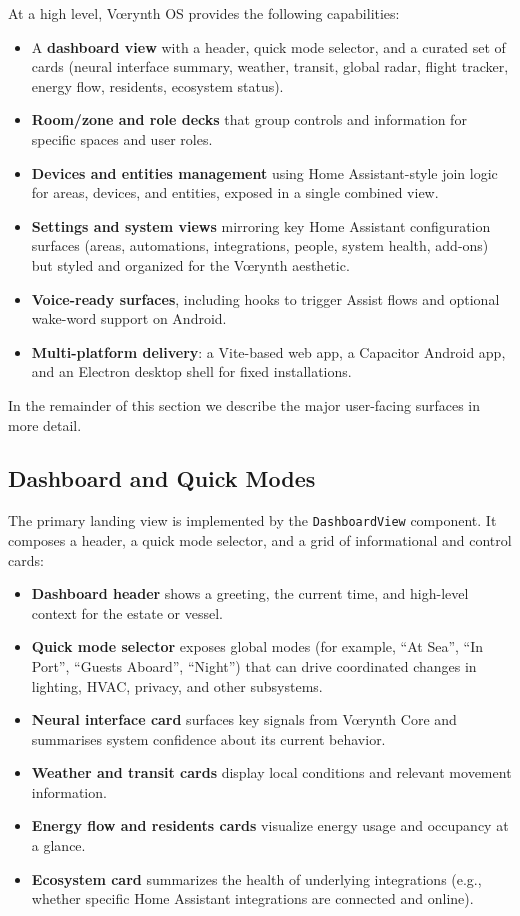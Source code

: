 \documentclass[11pt,a4paper]{article}
\begin{document}
At a high level, Vœrynth OS provides the following capabilities:
\begin{itemize}[leftmargin=*]
  \item A \textbf{dashboard view} with a header, quick mode selector, and a curated set of cards (neural interface summary, weather, transit, global radar, flight tracker, energy flow, residents, ecosystem status).
  \item \textbf{Room/zone and role decks} that group controls and information for specific spaces and user roles.
  \item \textbf{Devices and entities management} using Home Assistant-style join logic for areas, devices, and entities, exposed in a single combined view.
  \item \textbf{Settings and system views} mirroring key Home Assistant configuration surfaces (areas, automations, integrations, people, system health, add-ons) but styled and organized for the Vœrynth aesthetic.
  \item \textbf{Voice-ready surfaces}, including hooks to trigger Assist flows and optional wake-word support on Android.
  \item \textbf{Multi-platform delivery}: a Vite-based web app, a Capacitor Android app, and an Electron desktop shell for fixed installations.
\end{itemize}

In the remainder of this section we describe the major user-facing surfaces in more detail.

\subsection{Dashboard and Quick Modes}

The primary landing view is implemented by the \texttt{DashboardView} component. It composes a header, a quick mode selector, and a grid of informational and control cards:
\begin{itemize}[leftmargin=*]
  \item \textbf{Dashboard header} shows a greeting, the current time, and high-level context for the estate or vessel.
  \item \textbf{Quick mode selector} exposes global modes (for example, ``At Sea'', ``In Port'', ``Guests Aboard'', ``Night'') that can drive coordinated changes in lighting, HVAC, privacy, and other subsystems.
  \item \textbf{Neural interface card} surfaces key signals from Vœrynth Core and summarises system confidence about its current behavior.
  \item \textbf{Weather and transit cards} display local conditions and relevant movement information.
  \item \textbf{Energy flow and residents cards} visualize energy usage and occupancy at a glance.
  \item \textbf{Ecosystem card} summarizes the health of underlying integrations (e.g., whether specific Home Assistant integrations are connected and online).
\end{itemize}
\end{document}
